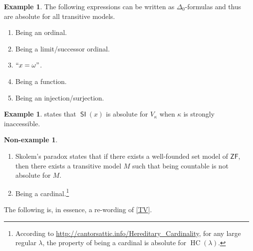 \documentclass[10pt,letterpaper,cm]{nupset}
\theoremstyle{definition}
\newtheorem{exmp}[definition]{Example}
\newtheorem{non-exmp}[definition]{Non-example}
\theoremstyle{theorem}
\theoremstyle{remark}
\newcommand{\1}{\mathbf{1}}
\newcommand{\0}{\vec 0}
\newcommand{\zf}{\mathsf{ZF}}
\DeclareMathOperator{\si}{\mathsf{SI}}
\DeclareMathOperator{\hc}{HC}
\newcommand{\be}{\begin{enumerate}}
\newcommand{\ee}{\end{enumerate}}
\begin{document}
\begin{exmp}\label{d0} The following expressions can be written as $\Delta_0$-formulas and thus are absolute for all transitive models. 
\be
\item Being an ordinal.
\item Being a limit/successor ordinal.
\item $``x=\omega"$.
\item Being a function.
\item Being an injection/surjection.
\ee
\end{exmp}

\begin{exmp}
 states that $\si(x)$ is absolute for $V_{\kappa}$ when $\kappa$ is strongly inaccessible.
\end{exmp}

\begin{non-exmp} $ $
\be
\item Skolem's paradox states that if there exists a well-founded set model of $\zf$, then there exists a transitive model $M$ such that being countable is not absolute for $M$.
\item Being a cardinal.\footnote{According to \url{http://cantorsattic.info/Hereditary_Cardinality}, for any large regular $\lambda$, the property of being a cardinal is absolute for $\hc(\lambda)$.}
\ee
\end{non-exmp}

\smallskip

The following is, in essence, a re-wording of \cref{TV}.
\end{document}
